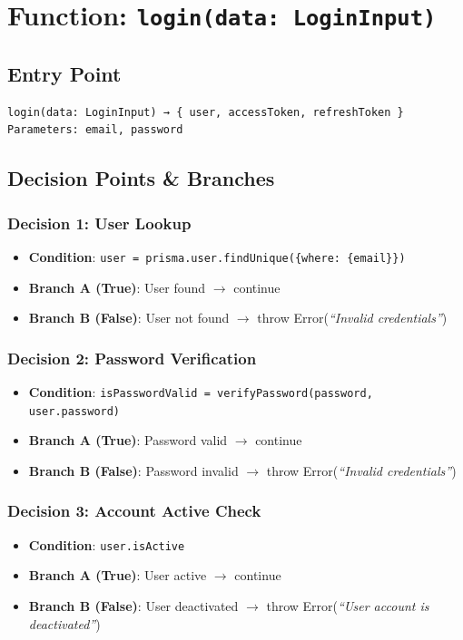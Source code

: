 \section{Function: \texttt{login(data: LoginInput)}}

\subsection{Entry Point}
\begin{verbatim}
login(data: LoginInput) → { user, accessToken, refreshToken }
Parameters: email, password
\end{verbatim}

\subsection{Decision Points \& Branches}

\subsubsection{Decision 1: User Lookup}
\begin{itemize}
    \item \textbf{Condition}: \texttt{user = prisma.user.findUnique(\{where: \{email\}\})}
    \item \textbf{Branch A (True)}: User found $\rightarrow$ continue
    \item \textbf{Branch B (False)}: User not found $\rightarrow$ throw Error(\textit{``Invalid credentials''})
\end{itemize}

\subsubsection{Decision 2: Password Verification}
\begin{itemize}
    \item \textbf{Condition}: \texttt{isPasswordValid = verifyPassword(password, user.password)}
    \item \textbf{Branch A (True)}: Password valid $\rightarrow$ continue
    \item \textbf{Branch B (False)}: Password invalid $\rightarrow$ throw Error(\textit{``Invalid credentials''})
\end{itemize}

\subsubsection{Decision 3: Account Active Check}
\begin{itemize}
    \item \textbf{Condition}: \texttt{user.isActive}
    \item \textbf{Branch A (True)}: User active $\rightarrow$ continue
    \item \textbf{Branch B (False)}: User deactivated $\rightarrow$ throw Error(\textit{``User account is deactivated''})
\end{itemize}

